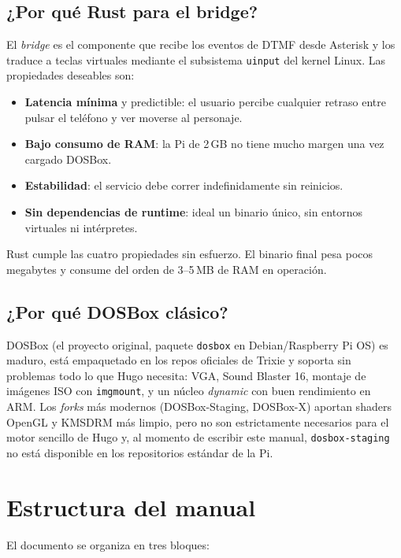 \subsection{¿Por qué Rust para el bridge?}

El \emph{bridge} es el componente que recibe los eventos de DTMF desde Asterisk y los traduce a teclas virtuales mediante el subsistema \texttt{uinput} del kernel Linux. Las propiedades deseables son:

\begin{itemize}
  \item \textbf{Latencia mínima} y predictible: el usuario percibe cualquier retraso entre pulsar el teléfono y ver moverse al personaje.
  \item \textbf{Bajo consumo de RAM}: la Pi de 2\,GB no tiene mucho margen una vez cargado DOSBox.
  \item \textbf{Estabilidad}: el servicio debe correr indefinidamente sin reinicios.
  \item \textbf{Sin dependencias de runtime}: ideal un binario único, sin entornos virtuales ni intérpretes.
\end{itemize}

Rust cumple las cuatro propiedades sin esfuerzo. El binario final pesa pocos megabytes y consume del orden de 3--5\,MB de RAM en operación.

\subsection{¿Por qué DOSBox clásico?}

DOSBox (el proyecto original, paquete \texttt{dosbox} en Debian/Raspberry Pi OS) es maduro, está empaquetado en los repos oficiales de Trixie y soporta sin problemas todo lo que Hugo necesita: VGA, Sound Blaster 16, montaje de imágenes ISO con \texttt{imgmount}, y un núcleo \emph{dynamic} con buen rendimiento en ARM. Los \emph{forks} más modernos (DOSBox-Staging, DOSBox-X) aportan shaders OpenGL y KMSDRM más limpio, pero no son estrictamente necesarios para el motor sencillo de Hugo y, al momento de escribir este manual, \texttt{dosbox-staging} no está disponible en los repositorios estándar de la Pi.

\section{Estructura del manual}

El documento se organiza en tres bloques:


